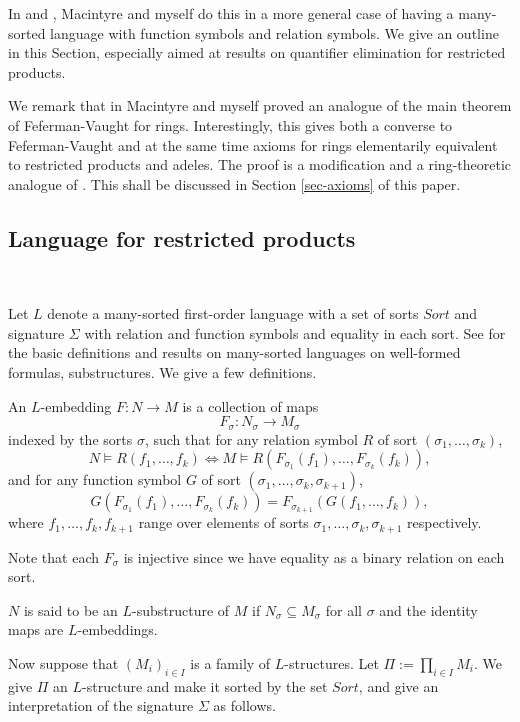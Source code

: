 \documentclass[12pt]{amsart}
\numberwithin{equation}{section}
\begin{document}
In \cite{DM-ad} and \cite{DM-supp}, Macintyre and myself do this in a more general case of having a many-sorted language with function symbols and relation symbols. 
We give an outline in this Section, especially aimed at results on quantifier elimination for restricted products.

We remark that in \cite{DM-axioms} Macintyre and myself proved an analogue of the main theorem of Feferman-Vaught for rings. Interestingly,  
this gives both a converse to Feferman-Vaught and at the same time axioms for rings elementarily equivalent to restricted products and adeles. The proof is a modification and a ring-theoretic analogue of \cite{FV}. This shall be discussed in Section \ref{sec-axioms} of this paper.

\medskip

\subsection{\bf Language for restricted products}\label{ssec-lang} 

\

\medskip

Let $L$ denote a many-sorted first-order language with a set of sorts $Sort$ and signature $\Sigma$ with relation and function symbols and equality in each sort. See \cite[Section 4.3]{enderton} for the basic definitions and results on many-sorted languages on well-formed formulas, substructures. We give a few definitions.

An $L$-embedding $F:N\rightarrow M$ is a collection of maps
$$F_{\sigma}: N_{\sigma} \rightarrow M_{\sigma}$$
indexed by the sorts $\sigma$, such that for any relation symbol $R$ of sort $(\sigma_1,\dots,\sigma_k)$, 
$$N \models R(f_1,\dots,f_k)\Leftrightarrow 
M \models R(F_{\sigma_1}(f_1),\dots,F_{\sigma_k}(f_k)),$$
and for any function symbol $G$ of sort $(\sigma_1,\dots,\sigma_k,\sigma_{k+1})$, 
$$G(F_{\sigma_1}(f_1),\dots,F_{\sigma_k}(f_k))=F_{\sigma_{k+1}}(G(f_1,\dots,f_k)),$$
where $f_1,\dots,f_k,f_{k+1}$ range over elements of sorts $\sigma_1,\dots,\sigma_k,\sigma_{k+1}$ respectively. 

Note that each $F_{\sigma}$ is injective since we have equality as a binary relation on each sort. 

$N$ is said to be an $L$-substructure of $M$ if $N_{\sigma} \subseteq M_{\sigma}$ for all $\sigma$ and the identity maps are $L$-embeddings. 

Now suppose that $(M_i)_{i\in I}$ is a family of $L$-structures. Let $\Pi:=\prod_{i\in I} M_i$. We give $\Pi$ an $L$-structure and make it sorted by the set 
$Sort$, and give an interpretation of the signature $\Sigma$ as follows.
\end{document}
